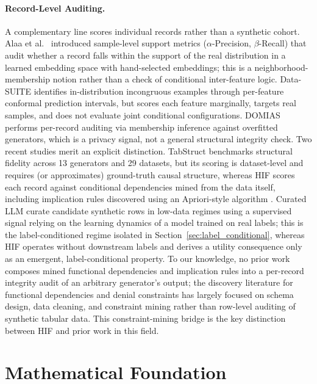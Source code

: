 \documentclass[pdflatex,sn-mathphys-num]{sn-jnl}
\theoremstyle{thmstyleone}%
\theoremstyle{thmstyletwo}%
\theoremstyle{thmstylethree}%
\begin{document}
\paragraph{Record-Level Auditing.} A complementary line scores individual records rather than a synthetic cohort. Alaa et al.\ \cite{alaa2022faithful} introduced sample-level support metrics ($\alpha$-Precision, $\beta$-Recall) that audit whether a record falls within the support of the real distribution in a learned embedding space with hand-selected embeddings; this is a neighborhood-membership notion rather than a check of conditional inter-feature logic. Data-SUITE \cite{seedat2022suite} identifies in-distribution incongruous examples through per-feature conformal prediction intervals, but scores each feature marginally, targets real samples, and does not evaluate joint conditional configurations. DOMIAS \cite{vanbreugel2023domias} performs per-record auditing via membership inference against overfitted generators, which is a privacy signal, not a general structural integrity check. Two recent studies merit an explicit distinction. TabStruct \cite{jiang2025tabstruct} benchmarks structural fidelity across 13 generators and 29 datasets, but its scoring is dataset-level and requires (or approximates) ground-truth causal structure, whereas HIF scores each record against conditional dependencies mined from the data itself, including implication rules discovered using an Apriori-style algorithm \cite{agrawal1994fast}. Curated LLM \cite{seedat2024curated} curate candidate synthetic rows in low-data regimes using a supervised signal relying on the learning dynamics of a model trained on real labels; this is the label-conditioned regime isolated in Section~\ref{sec:label_conditional}, whereas HIF operates without downstream labels and derives a utility consequence only as an emergent, label-conditional property. To our knowledge, no prior work composes mined functional dependencies and implication rules into a per-record integrity audit of an arbitrary generator's output; the discovery literature for functional dependencies and denial constraints \cite{huhtala1999tane,chu2013direct} has largely focused on schema design, data cleaning, and constraint mining rather than row-level auditing of synthetic tabular data. This constraint-mining bridge is the key distinction between HIF and prior work in this field.

\section{Mathematical Foundation}\label{sec:math}
\end{document}
